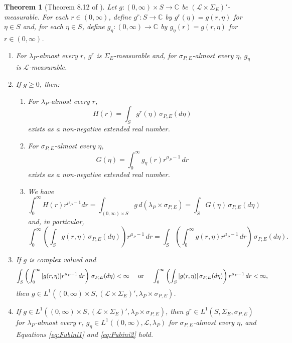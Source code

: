 \documentclass[11pt]{article}
\newtheorem{theorem}{Theorem}[section]
\theoremstyle{remark}
\begin{document}
\begin{theorem}[Theorem 8.12 of \cite{Rudin1987}]\label{thm:Fubini}
Let $g:(0,\infty)\times S\to\mathbb{C}$ be $(\mathcal{L}\times\Sigma_E)'$-measurable. For each $r\in (0,\infty)$, define $g^r:S\to\mathbb{C}$ by $g^r(\eta)=g(r,\eta)$ for $\eta\in S$ and, for each $\eta\in S$, define $g_\eta:(0,\infty)\to\mathbb{C}$ by $g_\eta(r)=g(r,\eta)$ for $r\in (0,\infty)$. 
\begin{enumerate}
\item For $\lambda_P$-almost every $r$, $g^r$ is $\Sigma_E$-measurable and, for $\sigma_{P,E}$-almost every $\eta$, $g_\eta$ is $\mathcal{L}$-measurable.
\item\label{item:Fubini1} If $g\geq 0$, then:
\begin{enumerate}
\item For $\lambda_P$-almost every $r$, 
\begin{equation*}
H(r)=\int_S g^r(\eta)\,\sigma_{P,E}(d\eta)
\end{equation*}
exists as a non-negative extended real number. 
\item For $\sigma_{P,E}$-almost every $\eta$,
\begin{equation*}
G(\eta)=\int_0^\infty g_\eta(r)r^{\mu_P-1}\,dr
\end{equation*}
exists as a non-negative extended real number. 
\item We have
\begin{equation}\label{eq:Fubini1}
\int_0^\infty H(r)r^{\mu_P-1}dr=\int_{(0,\infty)\times S}g\,d(\lambda_P\times\sigma_{P,E})=\int_S G(\eta)\,\sigma_{P,E}(d\eta)
\end{equation}
and, in particular,
\begin{equation}\label{eq:Fubini2}
\int_0^\infty\left(\int_S g(r,\eta)\,\sigma_{P,E}(d\eta)\right)r^{\mu_P-1}\,dr=\int_S\left(\int_0^\infty g(r,\eta)r^{\mu_P-1}\,dr\right)\,\sigma_{P,E}(d\eta).
\end{equation}
\end{enumerate}
\item\label{item:Fubini2} If $g$ is complex valued and
\begin{equation*}
\int_S\left(\int_0^\infty |g(r,\eta)|r^{\mu_P-1}\,dr\right)\,\sigma_{P,E}(d\eta)<\infty\hspace{.5cm}\mbox{or}\hspace{.5cm}\int_0^\infty\left(\int_S|g(r,\eta)|\,\sigma_{P,E}(d\eta)\right)r^{\mu_P-1}\,dr<\infty,
\end{equation*}
then $g\in L^1((0,\infty)\times S,(\mathcal{L}\times\Sigma_E)',\lambda_P\times\sigma_{P,E})$.
\item If $g\in L^1((0,\infty)\times S,(\mathcal{L}\times\Sigma_E)',\lambda_P\times\sigma_{P,E})$, then $g^r\in L^1(S,\Sigma_E,\sigma_{P,E})$ for $\lambda_P$-almost every $r$, $g_\eta\in L^1((0,\infty),\mathcal{L},\lambda_P)$ for $\sigma_{P,E}$-almost every $\eta$, and Equations \eqref{eq:Fubini1} and \eqref{eq:Fubini2} hold.
\end{enumerate}
\end{theorem}
\end{document}
